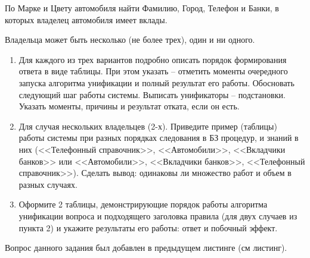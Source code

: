 По Марке и Цвету автомобиля найти Фамилию, Город, Телефон и Банки, в которых владелец автомобиля имеет вклады.

Владельца может быть несколько (не более трех), один и ни одного.
\begin{enumerate}
	\item Для каждого из трех вариантов подробно описать порядок формирования ответа в виде таблицы. При этом указать -- отметить моменты очередного запуска алгоритма унификации и полный результат его работы. Обосновать следующий шаг работы системы. Выписать унификаторы -- подстановки. Указать моменты, причины и результат отката, если он есть.
	\item Для случая нескольких владельцев (2-х).
	Приведите пример (таблицы) работы системы при разных порядках следования в БЗ процедур, и знаний в них (<<Телефонный справочник>>, <<Автомобили>>, <<Вкладчики банков>> или <<Автомобили>>, <<Вкладчики банков>>, <<Телефонный справочник>>). Сделать вывод: одинаковы ли множество работ и объем в разных случаях.
	\item Оформите 2 таблицы, демонстрирующие порядок работы алгоритма унификации вопроса и подходящего заголовка правила (для двух случаев из пункта 2) и укажите результаты его работы: ответ и побочный эффект.
\end{enumerate}

Вопрос данного задания был добавлен в предыдущем листинге (см листинг).

